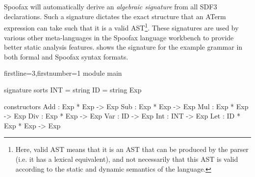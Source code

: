 \begin{grammar}
  \\

  \\

\end{grammar}


Spoofax will automatically derive an \textit{algebraic signature} from all SDF3 declarations. Such a signature dictates the exact structure that an \ac{ATerm} expression can take such that it is a valid AST\footnote{Here, valid \ac{AST} means that it is an \ac{AST} that can be produced by the parser (i.e. it has a lexical equivalent), and not necessarily that this \ac{AST} is valid according to the static and dynamic semantics of the language.}. These signatures are used by various other meta-languages in the Spoofax language workbench to provide better static analysis features.  shows the signature for the example grammar in both formal and Spoofax syntax formats.\\

\newsavebox{\sdfsignaturebox}
\begin{lrbox}{\sdfsignaturebox}\begin{minipage}{.45\textwidth}
\begin{statix*}{firstline=3,firstnumber=1}
module main

signature
  sorts
    INT = string
    ID = string
    Exp

  constructors
    Add : Exp * Exp -> Exp
    Sub : Exp * Exp -> Exp
    Mul : Exp * Exp -> Exp
    Div : Exp * Exp -> Exp
    Var : ID -> Exp
    Int : INT -> Exp
    Let : ID * Exp * Exp -> Exp
\end{statix*}
\end{minipage}
\end{lrbox}

